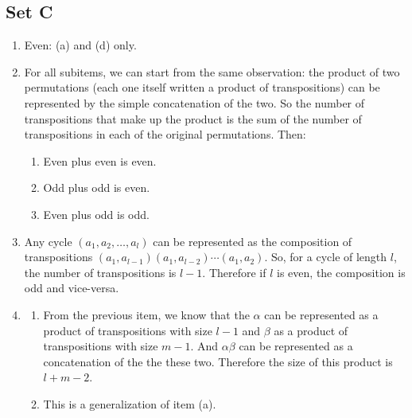 \documentclass{article}
\begin{document}
\subsection{Set C}
\begin{enumerate}
    \item Even: (a) and (d) only.

    \item For all subitems, we can start from the same observation: the product of two permutations (each one itself written a product of transpositions) can be represented by the simple concatenation of the two. So the number of transpositions that make up the product is the sum of the number of transpositions in each of the original permutations. Then: 
        \begin{enumerate}
            \item Even plus even is even.
            \item Odd plus odd is even.
            \item Even plus odd is odd.
        \end{enumerate}

    \item Any cycle $(a_1, a_2, \ldots, a_l)$ can be represented as the composition of transpositions $(a_1,a_{l - 1})(a_1,a_{l - 2})\cdots(a_1,a_2)$. So, for a cycle of length $l$, the number of transpositions is $l - 1$. Therefore if $l$ is even, the composition is odd and vice-versa.

    \item 
    \begin{enumerate}
        \item From the previous item, we know that the $\alpha$ can be represented as a product of transpositions with size $l - 1$ and $\beta$ as a product of transpositions with size $m - 1$. And $\alpha\beta$ can be represented as a concatenation of the the these two. Therefore the size of this product is $l + m - 2$.

        \item This is a generalization of item (a).
    \end{enumerate}
\end{enumerate}
\end{document}
